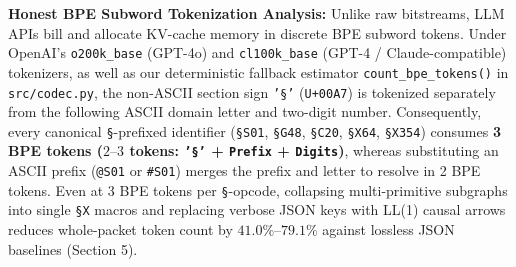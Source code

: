 \documentclass[9pt,a4paper]{extarticle}
\begin{document}
\textbf{Honest BPE Subword Tokenization Analysis:} Unlike raw bitstreams, LLM APIs bill and allocate KV-cache memory in discrete BPE subword tokens. Under OpenAI's \texttt{o200k\_base} (GPT-4o) and \texttt{cl100k\_base} (GPT-4 / Claude-compatible) tokenizers, as well as our deterministic fallback estimator \texttt{count\_bpe\_tokens()} in \texttt{src/codec.py}, the non-ASCII section sign \texttt{'\S'} (\texttt{U+00A7}) is tokenized separately from the following ASCII domain letter and two-digit number. Consequently, every canonical \texttt{\S}-prefixed identifier (\texttt{\S S01}, \texttt{\S G48}, \texttt{\S C20}, \texttt{\S X64}, \texttt{\S X354}) consumes \textbf{3 BPE tokens ($2\text{--}3$ tokens: \texttt{'\S'} + \texttt{Prefix} + \texttt{Digits})}, whereas substituting an ASCII prefix (\texttt{@S01} or \texttt{\#S01}) merges the prefix and letter to resolve in 2 BPE tokens. Even at 3 BPE tokens per \texttt{\S}-opcode, collapsing multi-primitive subgraphs into single \texttt{\S X} macros and replacing verbose JSON keys with LL(1) causal arrows reduces whole-packet token count by $41.0\%\text{--}79.1\%$ against lossless JSON baselines (Section 5).
\end{document}
